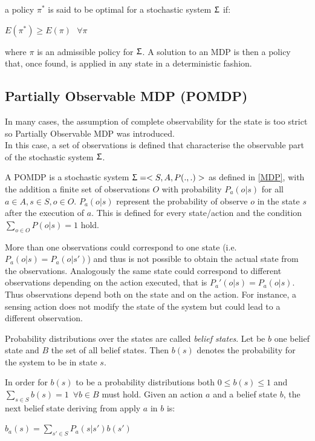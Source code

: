 \documentclass[pdftex,12pt,a4paper]{report}
\begin{document}
\noindent a policy $\pi^*$ is said to be optimal for a stochastic system $\Upsigma$ if:
\begin{center}
\noindent $E(\pi^*) \geqslant E(\pi) \,\,\,\, \forall\pi$ 
\end{center}

\noindent where $\pi$ is an admissible policy for $\Upsigma$.
A solution to an MDP is then a policy that, once found, is applied in any state in a deterministic fashion.
\newline

\subsection{Partially Observable MDP (POMDP)}\label{POMDP}
In many cases, the assumption of complete observability for the state is too strict so Partially Observable MDP was introduced.
\\\noindent In this case, a set of observations is defined that characterise the observable part of the stochastic system $\Upsigma$. 

\noindent A POMDP is a stochastic system $\Upsigma = <S,A,P(.,.)>$ as defined in \ref{MDP}, with the addition a finite set of observations $O$ with probability $P_a(o|s)$ for all $a \in A, s \in S, o \in O$. $P_a(o|s)$ represent the probability of observe $o$ in the state $s$ after the execution of $a$. This is defined for every state/action and the condition  $\sum\limits_{o \in O} P(o|s)=1$ hold.

\noindent More than one observations could correspond to one state (i.e. $P_a(o|s) = P_a(o|s')$) and thus is not possible to obtain the actual state from the observations.
Analogously the same state could correspond to different observations depending on the action executed, that is 
$P_a'(o|s) = P_a(o|s)$. 
Thus observations depend both on the state and on the action. For instance, a sensing action does not modify the state of the system but could lead to a different observation.

\noindent Probability distributions over the states are called \textit{belief states}. Let be $b$ one belief state and $B$ the set of all belief states. Then $b(s)$ denotes the probability for the system to be in state $s$.

\noindent In order for $b(s)$ to be a probability distributions both $0 \leqslant b(s) \leqslant 1$ and $\sum\limits_{s \in S} b(s)=1 \,\,\, \forall b \in B$ must hold.
Given an action $a$ and a belief state $b$, the next belief state deriving from apply $a$ in $b$ is:
\begin{center}
\noindent $b_a(s) = \sum\limits_{s' \in S} P_a(s|s')b(s')$ 
\end{center}
\end{document}
